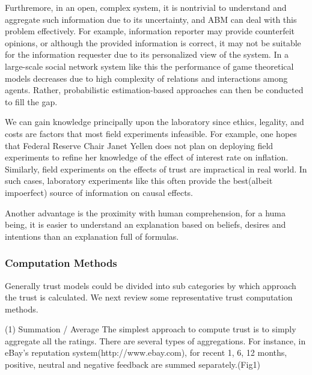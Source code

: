 \documentclass[11pt]{article}
\begin{document}
Furthremore, in an open, complex system, it is nontrivial to understand and aggregate such information due to its uncertainty, and ABM can deal with this problem effectively. For example, information reporter may provide counterfeit opinions, or although the provided information is correct, it may not be suitable for the information requester due to its personalized view of the system. In a large-scale social network system like this the performance of game theoretical models decreases due to high complexity of relations and interactions among agents. Rather, probabilistic estimation-based approaches can then be conducted to fill the gap.

We can gain knowledge principally upon the laboratory since ethics, legality, and costs are factors that most field experiments infeasible. For example, one hopes that Federal Reserve Chair Janet Yellen does not plan on deploying field experiments to refine her knowledge of the effect of interest rate on inflation. Similarly, field experiments on the effects of trust are impractical in real world. In such cases, laboratory experiments like this often provide the best(albeit impoerfect) source of information on causal effects.


Another advantage is the proximity with human comprehension, for a huma being, it is easier to understand an explanation based on beliefs, desires and intentions than an explanation full of formulas.    

\subsubsection{Computation Methods}

Generally trust models could be divided into sub categories by which approach the trust is calculated. We next review some representative trust computation methods.

(1) Summation / Average
The simplest approach to compute trust is to simply aggregate all the ratings. There are several types of aggregations. For instance, in eBay's reputation system(http://www.ebay.com), for recent 1, 6, 12 months, positive, neutral and negative feedback are summed separately.(Fig1)
\end{document}

